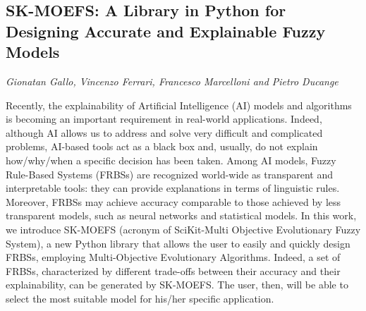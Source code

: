 \documentclass[../booklet.tex]{subfiles}
\begin{document}
\subsection[SK-MOEFS: A Library in Python for Designing Accurate and Explainable Fuzzy Models. {\it Gionatan Gallo, Vincenzo Ferrari, Francesco Marcelloni and Pietro Ducange}]{SK-MOEFS: A Library in Python for Designing Accurate and Explainable Fuzzy Models}
   

\begin{center}
  {\it Gionatan Gallo, Vincenzo Ferrari, Francesco Marcelloni and Pietro Ducange}
\end{center}



Recently, the explainability of Artificial Intelligence (AI) models and algorithms is becoming an important requirement in real-world applications. Indeed, although AI allows us to address and solve very difficult and complicated problems, AI-based tools act as a black box and, usually, do not explain how/why/when a specific decision has been taken. Among AI models, Fuzzy Rule-Based Systems (FRBSs) are recognized world-wide as transparent and interpretable tools: they can provide explanations in terms of linguistic rules. Moreover, FRBSs may achieve accuracy comparable to those achieved by less transparent models, such as neural networks and statistical models. In this work, we introduce SK-MOEFS (acronym of SciKit-Multi Objective Evolutionary Fuzzy System), a new Python library that allows the user to easily and quickly design FRBSs, employing Multi-Objective Evolutionary Algorithms. Indeed, a set of FRBSs, characterized by different trade-offs between their accuracy and their explainability, can be generated by SK-MOEFS. The user, then, will be able to select the most suitable model for his/her specific application.

\end{document}
